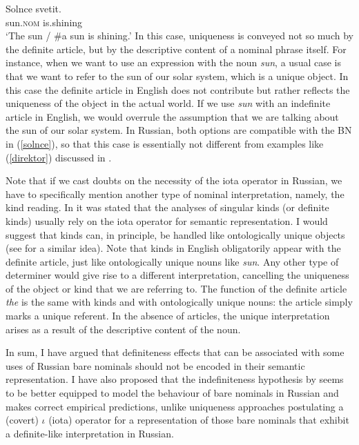 \documentclass[output=paper,colorlinks,citecolor=brown]{langscibook}
\begin{document}
\ea \label{solnce}  \gll 
Solnce		svetit. \\
sun.\textsc{nom}		is.shining\\
\glt `The sun / \#a sun is shining.'
\z
\noindent In this case, uniqueness is conveyed not so much by the definite article, but by the descriptive content of a nominal phrase itself. For instance, when we want to use an expression with the noun \textit{sun}, a usual case is that we want to refer to the sun of our solar system, which is a unique object. In this case the definite article in English does not contribute but rather reflects the uniqueness of the object in the actual world. If we use \textit{sun} with an indefinite article in English, we would overrule the assumption that we are talking about the sun of our solar system. In Russian, both options are compatible with the BN in (\ref{solnce}), so that this case is essentially not different from examples like (\ref{direktor}) discussed in .  

Note that if we cast doubts on the necessity of the iota operator in Russian, we have to specifically mention another type of nominal interpretation, namely, the kind reading. In  it was stated that the analyses of singular kinds (or definite kinds) usually rely on the iota operator for semantic representation. I would suggest that kinds can, in principle, be handled like ontologically unique objects (see \citealt{Simik2021} for a similar idea). Note that kinds in English obligatorily appear with the definite article, just like ontologically unique nouns like \textit{sun}. Any other type of determiner would give rise to a different interpretation, cancelling the uniqueness of the object or kind that we are referring to. The function of the definite article \textit{the} is the same with kinds and with ontologically unique nouns: the article simply marks a unique referent. In the absence of articles, the unique interpretation arises as a result of the descriptive content of the noun. 

In sum, I have argued that definiteness effects that can be associated with some uses of Russian bare nominals should not be encoded in their semantic representation. I have also proposed that the indefiniteness hypothesis by \citet{Heim2011} seems to be better equipped to model the behaviour of bare nominals in Russian and makes correct empirical predictions, unlike uniqueness approaches postulating a (covert) $\iota$ (iota) operator for a representation of those bare nominals that exhibit a definite-like interpretation in Russian.
\end{document}
